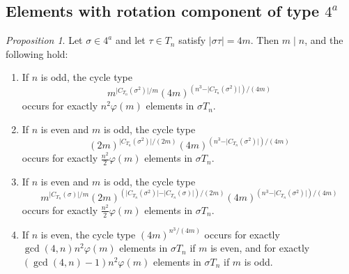 \documentclass[12pt]{article}
\theoremstyle{definition}
\theoremstyle{remark}
\newtheorem{proposition}[theorem]{Proposition}
\begin{document}
\subsection{Elements with rotation component of type $4^a$}



\begin{proposition}\label{prop:cycle-4a}
Let $\sigma\in 4^a$ and let $\tau\in T_n$ satisfy $\vert\sigma\tau\vert=4m$.
Then $m\mid n$, and the following hold:
\begin{enumerate}
\item[(a)] If $n$ is odd, the cycle type
\[
m^{\vert C_{T_n}(\sigma^2)\vert/m}
(4m)^{(n^3-\vert C_{T_n}(\sigma^2)\vert)/(4m)}
\]
occurs for exactly $n^2\varphi(m)$ elements in $\sigma T_n$.
\item[(b)] If $n$ is even and $m$ is odd, the cycle type
\[
(2m)^{\vert C_{T_n}(\sigma^2)\vert/(2m)}
(4m)^{(n^3-\vert C_{T_n}(\sigma^2)\vert)/(4m)}
\]
occurs for exactly $\frac{n^2}{2}\varphi(m)$ elements in $\sigma T_n$.
\item[(c)] If $n$ is even and $m$ is odd, the cycle type
\[
m^{\vert C_{T_n}(\sigma)\vert/m}
(2m)^{(\vert C_{T_n}(\sigma^2)\vert-\vert C_{T_n}(\sigma)\vert)/(2m)}
(4m)^{(n^3-\vert C_{T_n}(\sigma^2)\vert)/(4m)}
\]
occurs for exactly $\frac{n^2}{2}\varphi(m)$ elements in $\sigma T_n$.
\item[(d)] If $n$ is even, the cycle type
$(4m)^{n^3/(4m)}$
occurs for exactly $\gcd(4,n)n^2\varphi(m)$ elements in $\sigma T_n$ if $m$ is even, and for exactly
$(\gcd(4,n)-1)n^2\varphi(m)$ elements in $\sigma T_n$ if $m$ is odd.
\end{enumerate}
\end{proposition}
\end{document}
